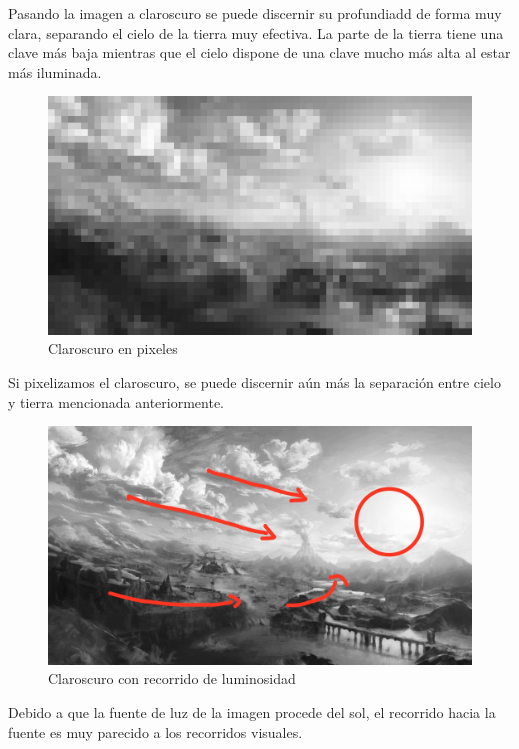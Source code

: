\documentclass[12pt]{article}
\begin{document}
          Pasando la imagen a claroscuro se puede discernir su profundiadd de forma muy clara, separando el cielo de la tierra muy efectiva. 
          La parte de la tierra tiene una clave más baja mientras que el cielo dispone de una clave mucho más alta al estar más iluminada. 
          \newpage
          \begin{figure}[H]
            \centering
            \includegraphics[scale = 0.2]{Jesus/Seccion2/pixel.jpg}
            \caption{Claroscuro en pixeles}
          \end{figure}
          Si pixelizamos el claroscuro, se puede discernir aún más la separación entre cielo y tierra mencionada anteriormente. 
          \newpage
          \begin{figure}[H]
            \centering
            \includegraphics[scale = 0.2]{Jesus/Seccion2/Clarocuro con recorridos.jpg}
            \caption{Claroscuro con recorrido de luminosidad}
          \end{figure}
          Debido a que la fuente de luz de la imagen procede del sol, el recorrido hacia la fuente es muy parecido a los recorridos visuales. 
          \newpage
\end{document}
